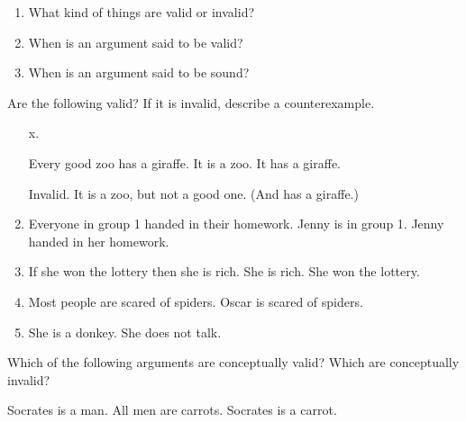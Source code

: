 \begin{practiceproblems}
\problempart
\begin{enumerate}
\item What kind of things are valid or invalid?
\item When is an argument said to be valid?
\item When is an argument said to be sound?
\end{enumerate}

\problempart
Are the following valid? If it is invalid, describe a counterexample.
\begin{enumerate}
\item[x.]
\begin{earg}
\prem Every good zoo has a giraffe.
\prem It is a zoo.
\conc It has a giraffe.
\end{earg}
\prem Invalid. It is a zoo, but not a good one. (And has a giraffe.)
\item
\begin{earg}
\prem Everyone in group 1 handed in their homework.
\prem Jenny is in group 1.
\conc Jenny handed in her homework.
\end{earg}
\item
\begin{earg}
\prem If she won the lottery then she is rich.
\prem She is rich.
\conc She won the lottery.
\end{earg}
\item
\begin{earg}
\prem Most people are scared of spiders.
\conc Oscar is scared of spiders.
\end{earg}
\item
\begin{earg}
\prem She is a donkey.
\conc She does not talk.
\end{earg}
\end{enumerate}


\problempart
Which of the following arguments are conceptually valid? Which are conceptually invalid?

\begin{earg}
\prem Socrates is a man.
\prem All men are carrots.
\conc Socrates is a carrot.
\end{earg}


\end{practiceproblems}
